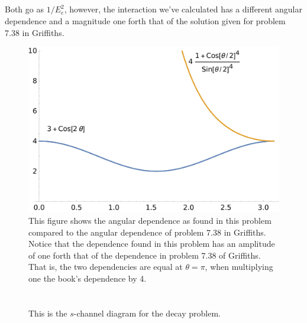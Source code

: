 \documentclass[
a4paper,
10pt,
twoside,
prd,
aps,
nofootinbib,
superscriptaddress,
floatfix,
preprintnumbers,
]{article}
\begin{document}
\subsection{}

Both go as $1/E_e^2$, however, the interaction we've calculated has a different angular dependence and a magnitude one forth that of the solution given for problem 7.38 in Griffiths.
\begin{figure}[H]
    \centering
    \includegraphics[width=0.5\linewidth]{figures/1e.pdf}
    \caption{%
    This figure shows the angular dependence as found in this problem compared to the angular dependence of problem 7.38 in Griffiths.
    Notice that the dependence found in this problem has an amplitude of one forth that of the dependence in problem 7.38 of Griffiths.
    That is, the two dependencies are equal at $\theta = \pi$, when multiplying one the book's dependence by 4.
    }
    \label{fig:1e_relationship}
\end{figure}


\section{}
\begin{figure}[H]
    \centering
    \caption{This is the $s$-channel diagram for the decay problem.}
    \label{fig: 4_1}
\end{figure}
\end{document}
